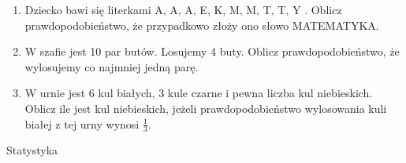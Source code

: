 \documentclass[12pt,a4paper]{article}
\begin{document}
\begin{enumerate}[1.]
	\item Dziecko bawi się literkami A, A, A, E, K, M, M, T, T, Y . Oblicz prawdopodobieństwo, że przypadkowo złoży
	ono słowo MATEMATYKA.
	
	\item W szafie jest 10 par butów. Losujemy 4 buty. Oblicz prawdopodobieństwo, że wylosujemy co najmniej jedną parę.
	
	\item W urnie jest 6 kul białych, 3 kule czarne i pewna liczba kul niebieskich. Oblicz ile jest kul niebieskich, jeżeli prawdopodobieństwo wylosowania kuli białej z tej urny wynosi $\frac{1}{3}$. 
\end{enumerate}

\newpage

\begin{center}
	\LARGE Statystyka
\end{center}
\vspace{1cm}
\end{document}
